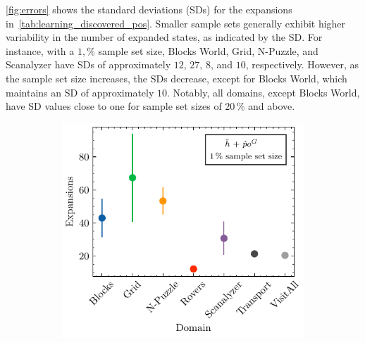 \documentclass[ppgc,diss,english]{iiufrgs}
\begin{document}
\cref{fig:errors} shows the standard deviations (SDs) for the expansions in~\cref{tab:learning_discovered_pos}. Smaller sample sets generally exhibit higher variability in the number of expanded states, as indicated by the SD. For instance, with a $1,\%$ sample set size, Blocks World, Grid, N-Puzzle, and Scanalyzer have SDs of approximately $12$, $27$, $8$, and $10$, respectively. However, as the sample set size increases, the SDs decrease, except for Blocks World, which maintains an SD of approximately $10$. Notably, all domains, except Blocks World, have SD values close to one for sample set sizes of $20\,\%$ and above.

\begin{figure}
  \caption{Mean number of expansions and its standard deviation per domain for GBFS guided by different heuristics with \pog trained using sample sets of different sizes.}
  \centering
  \vspace{\baselineskip}
  \begin{subfigure}{0.41\textwidth}
    \centering
    \includegraphics[width=\linewidth]{img/error_hNN_poG_1pct.pdf}
  \end{subfigure}
  \begin{subfigure}{0.41\textwidth}
    \centering

\end{subfigure}
\end{figure}
\end{document}
